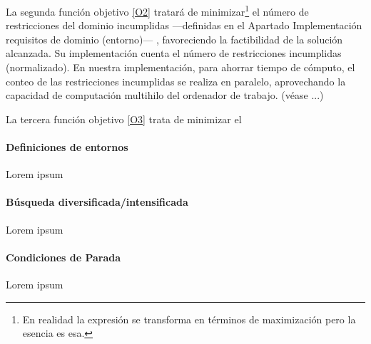 La segunda función objetivo \ref{O2} tratará de minimizar\footnote{En realidad la expresión se transforma en términos de maximización pero la esencia es esa.} el número de restricciones del dominio incumplidas ---definidas en el Apartado Implementación requisitos de dominio (entorno)--- %
, favoreciendo la factibilidad de la solución alcanzada. Su implementación cuenta el número de restricciones incumplidas (normalizado). En nuestra implementación, para ahorrar tiempo de cómputo, el conteo de las restricciones incumplidas se realiza en paralelo, aprovechando la capacidad de computación multihilo del ordenador de trabajo. (véase ...) %

La tercera función objetivo \ref{O3} trata de minimizar el 












\paragraph{Definiciones de entornos}
Lorem ipsum

\paragraph{Búsqueda diversificada/intensificada} \label{capitulo:3:busqueda-divers-intens}
Lorem ipsum

\paragraph{Condiciones de Parada}
\label{apartado:condiciones-parada}
Lorem ipsum










